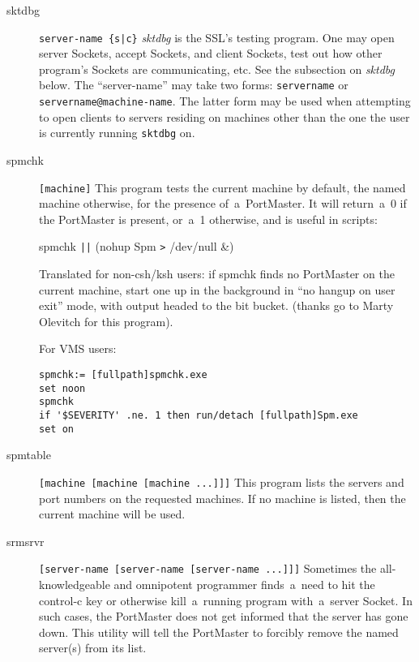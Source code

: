 \documentclass[12pt]{article}
\def\SSL{{\small SSL}}
\begin{document}
\begin{description}

  \item[sktdbg] \verb`server-name {s|c}`     {\em sktdbg} is the \SSL's testing program.  One may open server Sockets,
    accept Sockets, and client Sockets, test out how other program's Sockets
    are communicating, etc.  See the subsection on {\em sktdbg} below.  The
    ``server-name'' may take two forms: \verb`servername` or
    \verb`servername@machine-name`.  The latter form may be used when
    attempting to open clients to servers residing on machines other than the
    one the user is currently running \verb`sktdbg` on.

  \item[spmchk] \verb`[machine]`     This program tests the current machine by default, the named machine
    otherwise, for the presence of~a~PortMaster.  It will return~a~0 if
    the PortMaster is present, or~a~1 otherwise, and is useful in scripts:

      \begin{center}
       spmchk \verb`||` (nohup Spm \verb`>` /dev/null \&)       \end{center}

    Translated for non-csh/ksh users: if spmchk finds no PortMaster on the
    current machine, start one up in the background in ``no hangup on user
    exit'' mode, with output headed to the bit bucket. {\small (thanks go
    to Marty Olevitch for this program)}.

    For {\small VMS} users:

      \begin{center}
       \begin{minipage}[h]{5in}
        \begin{verbatim}
spmchk:= [fullpath]spmchk.exe
set noon
spmchk
if '$SEVERITY' .ne. 1 then run/detach [fullpath]Spm.exe
set on
        \end{verbatim}
       \end{minipage}
      \end{center}

  \item[spmtable] \verb`[machine [machine [machine ...]]]`     This program lists the servers and port numbers on the requested machines.
    If no machine is listed, then the current machine will be used.

  \item[srmsrvr] \verb`[server-name [server-name [server-name ...]]]`     Sometimes the all-knowledgeable and omnipotent programmer finds~a~need to
    hit the control-c key or otherwise kill~a~running program with~a~server
    Socket.  In such cases, the PortMaster does not get informed that the
    server has gone down.  This utility will tell the PortMaster to forcibly
    remove the named server(s) from its list.

\end{description}
\end{document}
